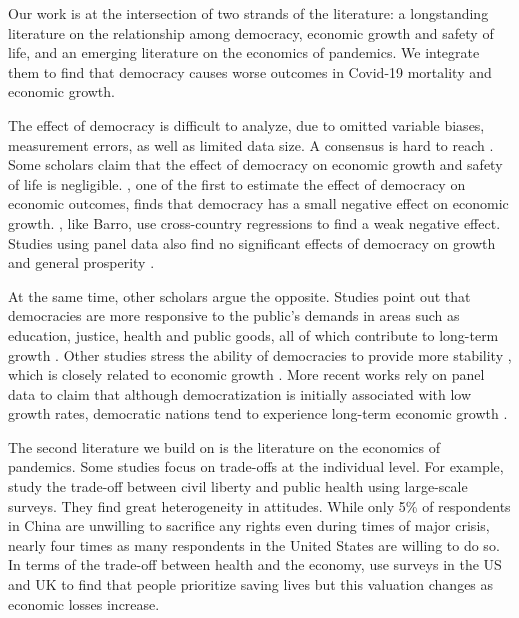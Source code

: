 Our work is at the intersection of two strands of the literature: a longstanding literature on the relationship among democracy, economic growth and safety of life, and an emerging literature on the economics of pandemics. We integrate them to find that democracy causes worse outcomes in Covid-19 mortality and economic growth. 

The effect of democracy is difficult to analyze, due to omitted variable biases, measurement errors, as well as limited data size. A consensus is hard to reach \parencite{meta}. 
Some scholars claim that the effect of democracy on economic growth and safety of life is negligible. \textcite{barro}, one of the first to estimate the effect of democracy on economic outcomes, finds that democracy has a small negative effect on economic growth. \textcite{tavares}, like Barro, use cross-country regressions to find a weak negative effect. Studies using panel data also find no significant effects of democracy on growth and general prosperity \parencite{burkhart, giavazzi}. 

At the same time, other scholars argue the opposite. Studies point out that democracies are more responsive to the public's demands in areas such as education, justice, health and public goods, all of which contribute to long-term growth \parencite{edu-dem-growth, benabou, baum-lake2001, baum-lake2003, rodrik1998}. 
Other studies stress the ability of democracies to provide more stability \parencite{sah}, which is closely related to economic growth \parencite{quinn-woolley}. More recent works rely on panel data to claim that although democratization is initially associated with low growth rates, democratic nations tend to experience long-term economic growth \parencite{dem-growth, ajr2014}.


The second literature we build on is the literature on the economics of pandemics. %
Some studies focus on trade-offs at the individual level. For example, \textcite{civil-liberty-survey} study the trade-off between civil liberty and public health using large-scale surveys. They find great heterogeneity in attitudes. While only 5\% of respondents in China are unwilling to sacrifice any rights even during times of major crisis, nearly four times as many respondents in the United States are willing to do so. In terms of the trade-off between health and the economy, \textcite{health-wealth} use surveys in the US and UK to find that people prioritize saving lives but this valuation changes as economic losses increase. 

